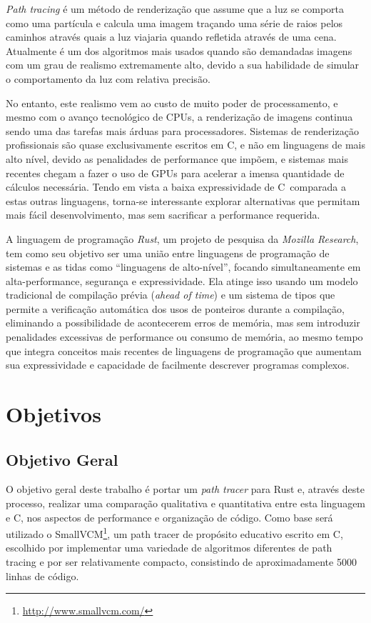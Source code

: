 \documentclass[12pt]{article}
\def\Cpp{{C\nolinebreak[4]\raisebox{.20ex}{\small\bf++}}}
\begin{document}
\emph{Path tracing} é um método de renderização que assume que a luz se comporta como uma partícula
e calcula uma imagem traçando uma série de raios pelos caminhos através quais a luz viajaria quando
refletida através de uma cena. Atualmente é um dos algoritmos mais usados quando são demandadas
imagens com um grau de realismo extremamente alto, devido a sua habilidade de simular o comportamento
da luz com relativa precisão.

No entanto, este realismo vem ao custo de muito poder de processamento, e mesmo com o avanço
tecnológico de CPUs, a renderização de imagens continua sendo uma das tarefas mais árduas para
processadores. Sistemas de renderização profissionais são quase exclusivamente escritos em \Cpp, e
não em linguagens de mais alto nível, devido as penalidades de performance que impõem, e sistemas
mais recentes chegam a fazer o uso de GPUs para acelerar a imensa quantidade de cálculos necessária.
Tendo em vista a baixa expressividade de \Cpp\ comparada a estas outras linguagens, torna-se
interessante explorar alternativas que permitam mais fácil desenvolvimento, mas sem sacrificar a
performance requerida.

A linguagem de programação \emph{Rust}, um projeto de pesquisa da \emph{Mozilla Research}, tem como
seu objetivo ser uma união entre linguagens de programação de sistemas e as tidas como ``linguagens
de alto-nível'', focando simultaneamente em alta-performance, segurança e expressividade. Ela atinge
isso usando um modelo tradicional de compilação prévia (\emph{ahead of time}) e um sistema de tipos
que permite a verificação automática dos usos de ponteiros durante a compilação, eliminando a
possibilidade de acontecerem erros de memória, mas sem introduzir penalidades excessivas de
performance ou consumo de memória, ao mesmo tempo que integra conceitos mais recentes de linguagens
de programação que aumentam sua expressividade e capacidade de facilmente descrever programas
complexos.

\section{Objetivos}

\subsection{Objetivo Geral}

O objetivo geral deste trabalho é portar um \emph{path tracer} para Rust e, através deste processo,
realizar uma comparação qualitativa e quantitativa entre esta linguagem e \Cpp, nos aspectos de
performance e organização de código. Como base será utilizado o
SmallVCM\footnote{\url{http://www.smallvcm.com/}}, um path tracer de propósito educativo escrito em
\Cpp, escolhido por implementar uma variedade de algoritmos diferentes de path tracing e por ser
relativamente compacto, consistindo de aproximadamente 5000 linhas de código.
\end{document}
